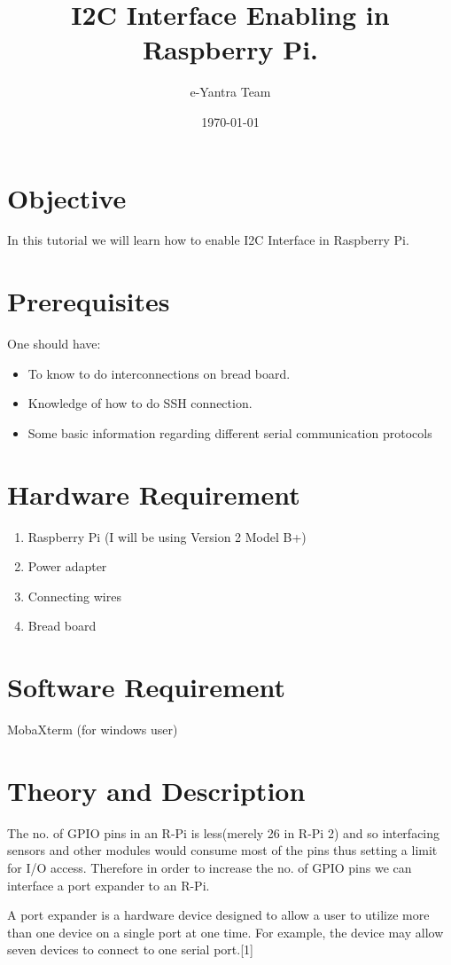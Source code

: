 \documentclass[11pt,a4paper]{article}
\title{I2C Interface Enabling in Raspberry Pi.}
\author{e-Yantra Team}
\date{\today}
\begin{document}
	\maketitle
	\newpage
	\tableofcontents
	\newpage
	\section{Objective}
	In this tutorial we will learn how to enable I2C Interface in Raspberry Pi.
	\section{Prerequisites}
	One should have:
	\begin{itemize}
		\item To know to do interconnections on bread board.
		\item Knowledge of how to do SSH connection.
		\item Some basic information regarding different serial communication \newline protocols
	\end{itemize}
	\section{Hardware Requirement}
	\begin{enumerate}
		\item Raspberry Pi (I will be using Version 2 Model B+)
		\item Power adapter
		\item Connecting wires
		\item Bread board
	\end{enumerate}
	\section{Software Requirement}
	MobaXterm (for windows user) 
	
	\newpage
	\section{Theory and Description}
	The no. of GPIO pins in an R-Pi is less(merely 26 in R-Pi 2) and so interfacing sensors and other modules would consume most of the pins thus setting a limit for I/O access. Therefore in order to increase the no. of GPIO pins we can interface a port expander to an R-Pi.
	
	A port expander is a hardware device designed to allow a user to utilize more than one device on a single port at one time. For example, the device may allow seven devices to connect to one serial port.[1]
	
\end{document}
